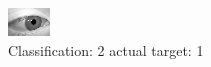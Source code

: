 \begin{figure}[h!]
\begin{center}
\includegraphics[width=0.60\columnwidth]{figures/ID2774_class_2_target_1.png}
\end{center}
\caption{ Classification: 2 actual target: 1}
\label{fig:ID2774_class_2_target_1}
\end{figure}
